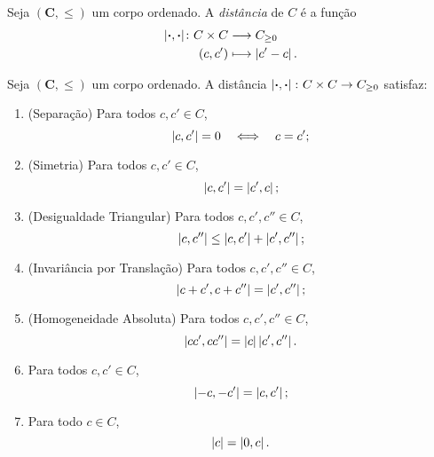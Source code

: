 \begin{definition}
Seja $(\bm C,\leq)$ um corpo ordenado. A \emph{distância} de $C$ é a função
	\begin{align*}
	{\left\vert{\bm{\cdot}},{\bm{\cdot}}\right\vert}\colon {C \times C} &\longrightarrow {C_{\geq 0}} \\{(c,c')} &\longmapsto \left\vert{c'-c}\right\vert.
	\end{align*}
\end{definition}

\begin{proposition}
Seja $(\bm C,\leq)$ um corpo ordenado. A distância $\left\vert{\bm{\cdot}},{\bm{\cdot}}\right\vert\colon C \times C \to C_{\geq 0}$ satisfaz:
	\begin{enumerate}
	\item (Separação) Para todos $c,c' \in C$,
		\begin{equation*}
		\left\vert{c},{c'}\right\vert = 0 \quad \Longleftrightarrow \quad c=c';
		\end{equation*}

	\item (Simetria) Para todos $c,c' \in C$,
		\begin{equation*}
		\left\vert{c},{c'}\right\vert = \left\vert{c'},{c}\right\vert;
		\end{equation*}

	\item (Desigualdade Triangular) Para todos $c,c',c'' \in C$,
		\begin{equation*}
		\left\vert{c},{c''}\right\vert \leq \left\vert{c},{c'}\right\vert + \left\vert{c'},{c''}\right\vert;
		\end{equation*}
	
	\item (Invariância por Translação) Para todos $c,c',c'' \in C$,
		\begin{equation*}
		\left\vert{c+c'},{c+c''}\right\vert = \left\vert{c'},{c''}\right\vert;
		\end{equation*}
	
	\item (Homogeneidade Absoluta) Para todos $c,c',c'' \in C$,
		\begin{equation*}
		\left\vert{cc'},{cc''}\right\vert = \left\vert{c}\right\vert\left\vert{c'},{c''}\right\vert.
		\end{equation*}
	
	\item Para todos $c,c' \in C$,
		\begin{equation*}
		\left\vert{-c},{-c'}\right\vert = \left\vert{c},{c'}\right\vert;
		\end{equation*}
	
	\item Para todo $c \in C$,
		\begin{equation*}
		\left\vert{c}\right\vert = \left\vert{0},{c}\right\vert.
		\end{equation*}
	

\end{enumerate}
\end{proposition}
